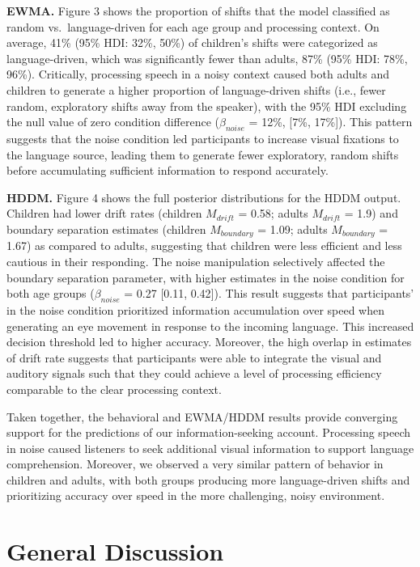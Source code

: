 \documentclass[10pt, letterpaper]{article}
\begin{document}
\textbf{EWMA.} Figure 3 shows the proportion of shifts that the model
classified as random vs.~language-driven for each age group and
processing context. On average, 41\% (95\% HDI: 32\%, 50\%) of
children's shifts were categorized as language-driven, which was
significantly fewer than adults, 87\% (95\% HDI: 78\%, 96\%).
Critically, processing speech in a noisy context caused both adults and
children to generate a higher proportion of language-driven shifts
(i.e., fewer random, exploratory shifts away from the speaker), with the
95\% HDI excluding the null value of zero condition difference
(\(\beta_{noise}\) = 12\%, {[}7\%, 17\%{]}). This pattern suggests that
the noise condition led participants to increase visual fixations to the
language source, leading them to generate fewer exploratory, random
shifts before accumulating sufficient information to respond accurately.

\textbf{HDDM.} Figure 4 shows the full posterior distributions for the
HDDM output. Children had lower drift rates (children \(M_{drift}\) =
0.58; adults \(M_{drift}\) = 1.9) and boundary separation estimates
(children \(M_{boundary}\) = 1.09; adults \(M_{boundary}\) = 1.67) as
compared to adults, suggesting that children were less efficient and
less cautious in their responding. The noise manipulation selectively
affected the boundary separation parameter, with higher estimates in the
noise condition for both age groups (\(\beta_{noise}\) = 0.27 {[}0.11,
0.42{]}). This result suggests that participants' in the noise condition
prioritized information accumulation over speed when generating an eye
movement in response to the incoming language. This increased decision
threshold led to higher accuracy. Moreover, the high overlap in
estimates of drift rate suggests that participants were able to
integrate the visual and auditory signals such that they could achieve a
level of processing efficiency comparable to the clear processing
context.

Taken together, the behavioral and EWMA/HDDM results provide converging
support for the predictions of our information-seeking account.
Processing speech in noise caused listeners to seek additional visual
information to support language comprehension. Moreover, we observed a
very similar pattern of behavior in children and adults, with both
groups producing more language-driven shifts and prioritizing accuracy
over speed in the more challenging, noisy environment.

\section{General Discussion}\label{general-discussion}
\end{document}
